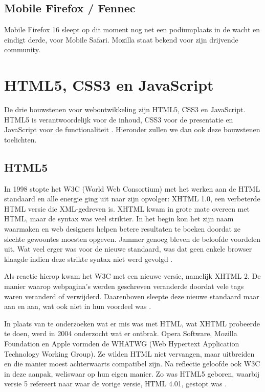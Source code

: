 \subsection{Mobile Firefox / Fennec}
Mobile Firefox 16 sleept op dit moment nog net een podiumplaats in de wacht en eindigt derde, voor Mobile Safari. Mozilla staat bekend voor zijn drijvende community. 


\section{HTML5, CSS3 en JavaScript}
\label{sec:html5-css3-js}
De drie bouwstenen voor webontwikkeling zijn HTML5, CSS3 en JavaScript. HTML5 is verantwoordelijk voor de inhoud, CSS3 voor de presentatie en JavaScript voor de functionaliteit \cite{PhilDutson2012}. Hieronder zullen we dan ook deze bouwstenen toelichten.

\subsection{HTML5}
In 1998 stopte het W3C (World Web Consortium) met het werken aan de HTML standaard en alle energie ging uit naar zijn opvolger: XHTML 1.0, een verbeterde HTML versie die XML-gedreven is. XHTML kwam in grote mate overeen met HTML, maar de syntax was veel strikter. In het begin kon het zijn naam waarmaken en web designers helpen betere resultaten te boeken doordat ze slechte gewoontes moesten opgeven. Jammer genoeg bleven de beloofde voordelen uit. Wat veel erger was voor de nieuwe standaard, was dat geen enkele browser klaagde indien deze strikte syntax niet werd gevolgd \cite{MacDonald2011}.

Als reactie hierop kwam het W3C met een nieuwe versie, namelijk XHTML 2. De manier waarop webpagina's werden geschreven veranderde doordat vele tags waren veranderd of verwijderd. Daarenboven sleepte deze nieuwe standaard maar aan en aan, wat ook niet in hun voordeel was \cite{MacDonald2011}. 

In plaats van te onderzoeken wat er mis was met HTML, wat XHTML probeerde te doen, werd in 2004 onderzocht wat er ontbrak. Opera Software, Mozilla Foundation en Apple vormden de WHATWG (Web Hypertext Application Technology Working Group). Ze wilden HTML niet vervangen, maar uitbreiden en die manier moest achterwaarts compatibel zijn. Na reflectie geloofde ook W3C in deze aanpak, weliswaar op hun eigen manier.  Zo was HTML5 geboren, waarbij versie 5 refereert naar waar de vorige versie, HTML 4.01, gestopt was \cite{MacDonald2011}.

